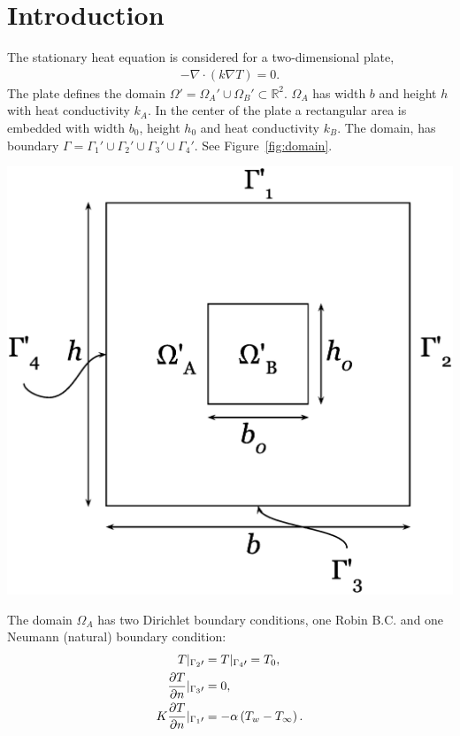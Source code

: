 \section{Introduction}
The stationary heat equation is considered for a two-dimensional plate,
\begin{gather}
    -\nabla\cdot\left(k\nabla T\right)=0.
\end{gather}\label{eq:heat}The plate defines the domain $\Omega\prime= \Omega_A\prime\cup\Omega_B\prime \subset \mathbb{R}^2$. $\Omega_A$ has width $b$ and height $h$ with heat conductivity $k_A$. In the center of the plate a rectangular area is embedded with width $b_0$, height $h_0$ and heat conductivity $k_B$. The domain, has boundary $\Gamma=\Gamma_1\prime\cup\Gamma_2\prime\cup\Gamma_3\prime\cup\Gamma_4\prime$. See Figure~\ref{fig:domain}. 
\begin{Figure}
 \centerfloat
 \includegraphics[width=0.7\linewidth]{domain.eps}
 \label{fig:domain}
\end{Figure}The domain $\Omega_A$ has two Dirichlet boundary conditions, one Robin B.C. and one Neumann (natural) boundary condition: 
\begin{gather*}
\begin{align*}
    T\arrowvert_{\Gamma_2\prime} &= T\arrowvert_{\Gamma_4\prime} = T_0,\\
    \frac{\partial T}{\partial n}\arrowvert_{\Gamma_3\prime} &= 0,\\
    K\frac{\partial T}{\partial n}\arrowvert_{\Gamma_1\prime} &= -\alpha \left(T_w - T_{\infty}\right).
\end{align*}
\end{gather*}
